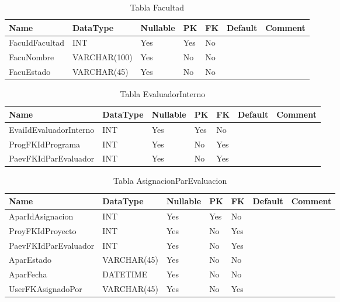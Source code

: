 \begin{table}
	\caption{Tabla Facultad}
	\label{labelTableFacultad}
	\begin{tabular}{ |l|l|l|l|l|l|l| }
		\hline
		Name & DataType & Nullable & PK & FK & Default & Comment \\ \hline
		FacuIdFacultad & INT & Yes & Yes & No &  & \\ \hline 
		FacuNombre & VARCHAR(100) & Yes & No & No &  & \\ \hline 
		FacuEstado & VARCHAR(45) & Yes & No & No &  & \\ \hline 
		
	\end{tabular}
\end{table}


\begin{table}
	\caption{Tabla EvaluadorInterno}
	\label{labelTableEvaluadorInterno}
	\begin{tabular}{ |l|l|l|l|l|l|l| }
		\hline
		Name & DataType & Nullable & PK & FK & Default & Comment \\ \hline
		EvaiIdEvaluadorInterno & INT & Yes & Yes & No &  & \\ \hline 
		ProgFKIdPrograma & INT & Yes & No & Yes &  & \\ \hline 
		PaevFKIdParEvaluador & INT & Yes & No & Yes &  & \\ \hline 
		
	\end{tabular}
\end{table}


\begin{table}
	\caption{Tabla AsignacionParEvaluacion}
	\label{labelTableAsignacionParEvaluacion}
	\begin{tabular}{ |l|l|l|l|l|l|l| }
		\hline
		Name & DataType & Nullable & PK & FK & Default & Comment \\ \hline
		AparIdAsignacion & INT & Yes & Yes & No &  & \\ \hline 
		ProyFKIdProyecto & INT & Yes & No & Yes &  & \\ \hline 
		PaevFKIdParEvaluador & INT & Yes & No & Yes &  & \\ \hline 
		AparEstado & VARCHAR(45) & Yes & No & No &  & \\ \hline 
		AparFecha & DATETIME & Yes & No & No &  & \\ \hline 
		UserFKAsignadoPor & VARCHAR(45) & Yes & No & Yes &  & \\ \hline 
		
	\end{tabular}
\end{table}


